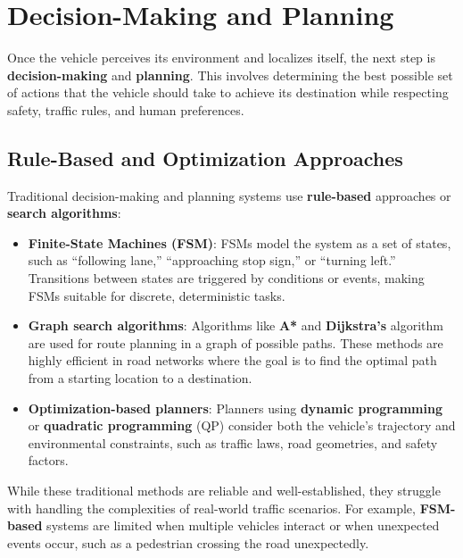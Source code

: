 \documentclass[12pt,a4paper]{article}
\begin{document}
\section{Decision-Making and Planning}
Once the vehicle perceives its environment and localizes itself, the next step is \textbf{decision-making} and \textbf{planning}. This involves determining the best possible set of actions that the vehicle should take to achieve its destination while respecting safety, traffic rules, and human preferences.

\subsection{Rule-Based and Optimization Approaches}
Traditional decision-making and planning systems use \textbf{rule-based} approaches or \textbf{search algorithms}:
\begin{itemize}
    \item \textbf{Finite-State Machines (FSM)}: FSMs model the system as a set of states, such as “following lane,” “approaching stop sign,” or “turning left.” Transitions between states are triggered by conditions or events, making FSMs suitable for discrete, deterministic tasks.
    \item \textbf{Graph search algorithms}: Algorithms like \textbf{A*} and \textbf{Dijkstra’s} algorithm are used for route planning in a graph of possible paths. These methods are highly efficient in road networks where the goal is to find the optimal path from a starting location to a destination.
    \item \textbf{Optimization-based planners}: Planners using \textbf{dynamic programming} or \textbf{quadratic programming} (QP) consider both the vehicle's trajectory and environmental constraints, such as traffic laws, road geometries, and safety factors.
\end{itemize}

While these traditional methods are reliable and well-established, they struggle with handling the complexities of real-world traffic scenarios. For example, \textbf{FSM-based} systems are limited when multiple vehicles interact or when unexpected events occur, such as a pedestrian crossing the road unexpectedly.
\end{document}
